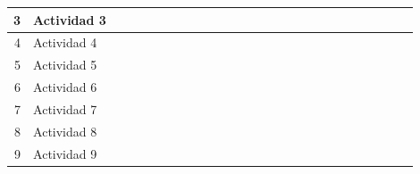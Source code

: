\documentclass[10pt,letterpaper]{report}
\begin{document}
\begin{landscape}
\begin{table}[htbp]
{\begin{tabular}{|r|l|r|r|r|r|r|r|r|r|r|r|r|r|r|r|r|r|r|r|r|r|r|r|r|r|}
			\midrule
			3     & Actividad 3 & \cellcolor[rgb]{ .557,  .663,  .859} & \cellcolor[rgb]{ .557,  .663,  .859} & \cellcolor[rgb]{ .557,  .663,  .859} &       &       &       &       &       &       &       &       &       &       &       &       &       &       &       &       &       &       &       &       &  \\
			\midrule
			4     & Actividad 4 &       &       &       &       &       &       &       & \cellcolor[rgb]{ .557,  .663,  .859} & \cellcolor[rgb]{ .557,  .663,  .859} & \cellcolor[rgb]{ .557,  .663,  .859} & \cellcolor[rgb]{ .557,  .663,  .859} & \cellcolor[rgb]{ .557,  .663,  .859} &       &       &       &       &       &       &       &       &       &       &       &  \\
			\midrule
			5     & Actividad 5 &       &       &       &       &       &       &       & \cellcolor[rgb]{ .557,  .663,  .859} & \cellcolor[rgb]{ .557,  .663,  .859} & \cellcolor[rgb]{ .557,  .663,  .859} & \cellcolor[rgb]{ .557,  .663,  .859} & \cellcolor[rgb]{ .557,  .663,  .859} &       &       &       &       &       &       &       &       &       &       &       &  \\
			\midrule
			6     & Actividad 6 &       &       &       &       &       &       &       &       &       &       &       &       & \cellcolor[rgb]{ .557,  .663,  .859} & \cellcolor[rgb]{ .557,  .663,  .859} & \cellcolor[rgb]{ .557,  .663,  .859} & \cellcolor[rgb]{ .557,  .663,  .859} &       &       &       &       &       &       &       &  \\
			\midrule
			7     & Actividad 7 &       &       &       &       &       &       &       &       &       &       &       &       &       & \cellcolor[rgb]{ .557,  .663,  .859} & \cellcolor[rgb]{ .557,  .663,  .859} & \cellcolor[rgb]{ .557,  .663,  .859} & \cellcolor[rgb]{ .557,  .663,  .859} & \cellcolor[rgb]{ .557,  .663,  .859} &       &       &       &       &       &  \\
			\midrule
			8     & Actividad 8 &       &       &       &       &       &       &       &       &       &       &       &       &       &       &       &       &       &       & \cellcolor[rgb]{ .557,  .663,  .859} & \cellcolor[rgb]{ .557,  .663,  .859} & \cellcolor[rgb]{ .557,  .663,  .859} & \cellcolor[rgb]{ .557,  .663,  .859} &       &  \\
			\midrule
			9     & Actividad 9 &       &       &       &       &       &       &       &       &       &       &       &       &       &       &       &       &       &       &       &       &       &       &       &  \\

\end{tabular}}
\end{table}
\end{landscape}
\end{document}
